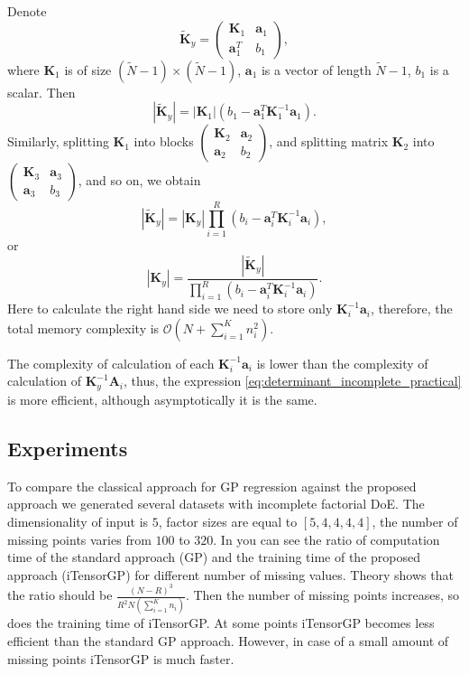 Denote
\[
\mathbf{\widetilde{K}}_y = \begin{pmatrix}
  \mathbf{K}_1 & \mathbf{a}_1 \\
  \mathbf{a}_1^T & b_1
\end{pmatrix},
\]
where $\mathbf{K}_1$ is of size $(\widetilde{N} - 1) \times (\widetilde{N} - 1)$,
$\mathbf{a}_1$ is a vector of length $\widetilde{N} - 1$, $b_1$ is a scalar.
Then
\[
|\mathbf{\widetilde{K}}_y| = |\mathbf{K}_1| (b_1 - \mathbf{a}_1^T \mathbf{K}_1^{-1}\mathbf{a}_1).
\]
Similarly, splitting $\mathbf{K}_1$ into blocks
$\begin{pmatrix}
\mathbf{K}_2 & \mathbf{a}_2 \\
\mathbf{a}_2 & b_2
\end{pmatrix}$,
and splitting matrix $\mathbf{K}_2$ into
$\begin{pmatrix}
\mathbf{K}_3 & \mathbf{a}_3 \\
\mathbf{a}_3 & b_3
\end{pmatrix}$,
and so on, we obtain
\[
|\mathbf{\widetilde{K}}_y| =
|\mathbf{K}_y| \prod_{i = 1}^R(b_i - \mathbf{a}_i^T\mathbf{K}_i^{-1}\mathbf{a}_i),
\]
or
\begin{equation}
\label{eq:determinant_incomplete_practical}
|\mathbf{K}_y| =
\frac{|\mathbf{\widetilde{K}}_y|}{\prod_{i = 1}^R(b_i -
\mathbf{a}_i^T\mathbf{K}_i^{-1} \mathbf{a}_i)}.
\end{equation}
Here to calculate the right hand side we need to store only $\mathbf{K}_i^{-1}\mathbf{a}_i$,
therefore, the total memory complexity is $\mathcal{O}(N + \sum_{i = 1}^K n_i^2)$.

The complexity of calculation of each $\mathbf{K}_i^{-1}\mathbf{a}_i$ is lower
than the complexity of calculation of $\mathbf{K}_y^{-1}\mathbf{A}_i$,
thus, the expression \eqref{eq:determinant_incomplete_practical} is more efficient,
although asymptotically it is the same.


\subsection{Experiments}
To compare the classical approach for GP regression against the proposed approach
we generated several datasets with incomplete factorial DoE.
The dimensionality of input is $5$, factor sizes are equal to $[5, 4, 4, 4, 4]$, the number of missing points varies from $100$ to $320$.
In  you can see the ratio of computation time of the standard approach (GP)
and the training time of the proposed approach (iTensorGP) for different number of missing
values.
Theory shows that the ratio should be $\frac{(N - R)^3}{R^2 N(\sum_{i = 1}^K n_i)}$.
Then the number of missing points increases, so does the training time of iTensorGP.
At some points iTensorGP becomes less efficient than the standard GP approach.
However, in case of a small amount of missing points iTensorGP is much faster.


